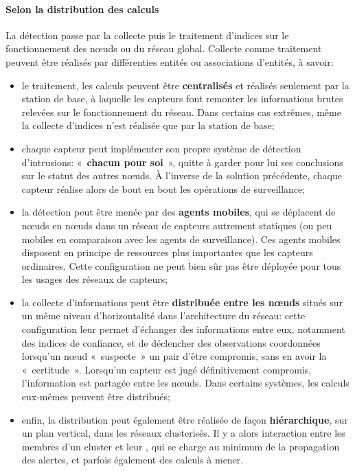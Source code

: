         \paragraph{Selon la distribution des calculs}
La détection passe par la collecte puis le traitement d'indices sur le fonctionnement des nœuds ou du réseau global.
Collecte comme traitement peuvent être réalisés par différenties entités ou associations d'entités, à savoir:
\begin{itemize}
    \item le traitement, les calculs peuvent être \textbf{centralisés} et réalisés seulement par la station de base, à laquelle les capteurs font remonter les informations brutes relevées sur le fonctionnement du réseau. Dans certains cas extrêmes, même la collecte d'indices n'est réalisée que par la station de base;
    \item chaque capteur peut implémenter son propre système de détection d'intrusions: « \textbf{chacun pour soi} », quitte à garder pour lui ses conclusions sur le statut des autres nœuds. À l'inverse de la solution précédente, chaque capteur réalise alors de bout en bout les opérations de surveillance;
    \item la détection peut être menée par des \textbf{agents mobiles}, qui se déplacent de nœuds en nœuds dans un réseau de capteurs autrement statiques (ou peu mobiles en comparaison avec les agents de surveillance). Ces agents mobiles disposent en principe de ressources plus importantes que les capteurs ordinaires. Cette configuration ne peut bien sûr pas être déployée pour tous les usages des réseaux de capteurs;
    \item la collecte d'informations peut être \textbf{distribuée entre les nœuds} situés sur un même niveau d'horizontalité dans l'architecture du réseau: cette configuration leur permet d'échanger des informations entre eux, notamment des indices de confiance, et de déclencher des observations coordonnées lorsqu'un nœud « suspecte » un pair d'être compromis, sans en avoir la « certitude ». Lorsqu'un capteur est jugé définitivement compromis, l'information est partagée entre les nœuds. Dans certains systèmes, les calculs eux-mêmes peuvent être distribués;
    \item enfin, la distribution peut également être réalisée de façon \textbf{hiérarchique}, sur un plan vertical, dans les réseaux clusterisés. Il y a alors interaction entre les membres d'un cluster et leur \ch, qui se charge au minimum de la propagation des alertes, et parfois également des calculs à mener.
\end{itemize}

